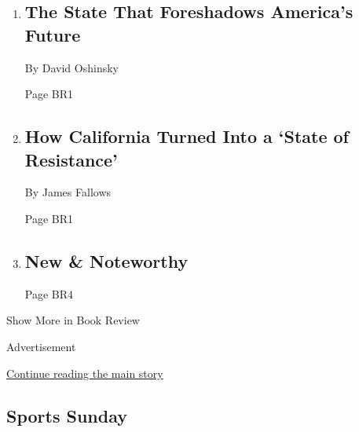 \begin{enumerate}
\def\labelenumi{\arabic{enumi}.}
\item
  \href{/2018/04/23/books/review/lawrence-wright-god-save-texas.html}{}

  \hypertarget{the-state-that-foreshadows-americas-future}{%
  \subsection{The State That Foreshadows America's
  Future}\label{the-state-that-foreshadows-americas-future}}

  By David Oshinsky

  Page BR1
\item
  \href{/2018/04/23/books/review/state-of-resistance-manuel-pastor.html}{}

  \hypertarget{how-california-turned-into-a-state-of-resistance}{%
  \subsection{How California Turned Into a `State of
  Resistance'}\label{how-california-turned-into-a-state-of-resistance}}

  By James Fallows

  Page BR1
\item
  \href{/2018/04/24/books/review/new-noteworthy-julie-bosman.html}{}

  \hypertarget{new--noteworthy}{%
  \subsection{New \& Noteworthy}\label{new--noteworthy}}

  Page BR4
\end{enumerate}

Show More in Book Review

Advertisement

\protect\hyperlink{after-mid6}{Continue reading the main story}

\hypertarget{sports-sunday}{%
\subsection{Sports Sunday}\label{sports-sunday}}

